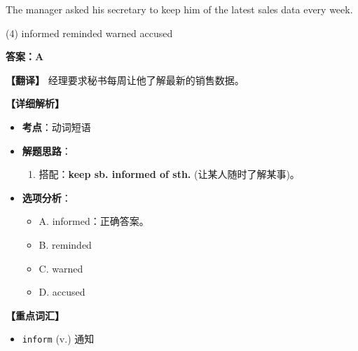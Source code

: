 \documentclass[11pt, a4paper]{article}
\newcommand{\analysis}[4]{
    \begin{solutionbox}
        \textbf{答案：#1}
        
        \textbf{【翻译】} #2
        
        \textbf{【详细解析】}
        #3
        
        \textbf{【重点词汇】}
        #4
    \end{solutionbox}
}
\newcommand{\blank}{\underline{\hspace{1.5cm}}}
\begin{document}
\begin{questions}
    \item The manager asked his secretary to keep him \blank of the latest sales data every week.
    \begin{tasks}(4)
        \task informed \task reminded \task warned \task accused
    \end{tasks}
    \analysis{A}{经理要求秘书每周让他了解最新的销售数据。}{
        \begin{itemize}
            \item \textbf{考点}：动词短语
            \item \textbf{解题思路}：
                \begin{enumerate}
                    \item 搭配：\textbf{keep sb. informed of sth.} (让某人随时了解某事)。
                \end{enumerate}
            \item \textbf{选项分析}：
                \begin{itemize}
                    \item A. informed：正确答案。
                    \item B. reminded
                    \item C. warned
                    \item D. accused
                \end{itemize}
        \end{itemize}
    }{
        \begin{itemize}
            \item \texttt{inform} (v.) 通知
        \end{itemize}
    }


\end{questions}
\end{document}
